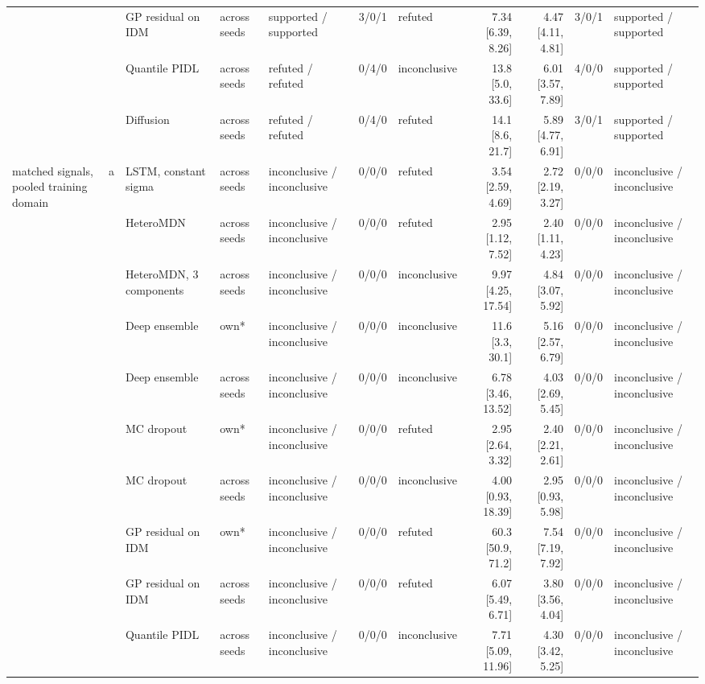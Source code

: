 \begin{longtable}{lllllrlrrrl}
 &  & GP residual on IDM & across seeds & supported / supported & 3/0/1 & refuted & 7.34 [6.39, 8.26] & 4.47 [4.11, 4.81] & 3/0/1 & supported / supported \\
 &  & Quantile PIDL & across seeds & refuted / refuted & 0/4/0 & inconclusive & 13.8 [5.0, 33.6] & 6.01 [3.57, 7.89] & 4/0/0 & supported / supported \\
 &  & Diffusion & across seeds & refuted / refuted & 0/4/0 & refuted & 14.1 [8.6, 21.7] & 5.89 [4.77, 6.91] & 3/0/1 & supported / supported \\
\midrule
matched signals, pooled training domain & a & LSTM, constant sigma & across seeds & inconclusive / inconclusive & 0/0/0 & refuted & 3.54 [2.59, 4.69] & 2.72 [2.19, 3.27] & 0/0/0 & inconclusive / inconclusive \\
 &  & HeteroMDN & across seeds & inconclusive / inconclusive & 0/0/0 & refuted & 2.95 [1.12, 7.52] & 2.40 [1.11, 4.23] & 0/0/0 & inconclusive / inconclusive \\
 &  & HeteroMDN, 3 components & across seeds & inconclusive / inconclusive & 0/0/0 & inconclusive & 9.97 [4.25, 17.54] & 4.84 [3.07, 5.92] & 0/0/0 & inconclusive / inconclusive \\
 &  & Deep ensemble & own* & inconclusive / inconclusive & 0/0/0 & inconclusive & 11.6 [3.3, 30.1] & 5.16 [2.57, 6.79] & 0/0/0 & inconclusive / inconclusive \\
 &  & Deep ensemble & across seeds & inconclusive / inconclusive & 0/0/0 & inconclusive & 6.78 [3.46, 13.52] & 4.03 [2.69, 5.45] & 0/0/0 & inconclusive / inconclusive \\
 &  & MC dropout & own* & inconclusive / inconclusive & 0/0/0 & refuted & 2.95 [2.64, 3.32] & 2.40 [2.21, 2.61] & 0/0/0 & inconclusive / inconclusive \\
 &  & MC dropout & across seeds & inconclusive / inconclusive & 0/0/0 & inconclusive & 4.00 [0.93, 18.39] & 2.95 [0.93, 5.98] & 0/0/0 & inconclusive / inconclusive \\
 &  & GP residual on IDM & own* & inconclusive / inconclusive & 0/0/0 & refuted & 60.3 [50.9, 71.2] & 7.54 [7.19, 7.92] & 0/0/0 & inconclusive / inconclusive \\
 &  & GP residual on IDM & across seeds & inconclusive / inconclusive & 0/0/0 & refuted & 6.07 [5.49, 6.71] & 3.80 [3.56, 4.04] & 0/0/0 & inconclusive / inconclusive \\
 &  & Quantile PIDL & across seeds & inconclusive / inconclusive & 0/0/0 & inconclusive & 7.71 [5.09, 11.96] & 4.30 [3.42, 5.25] & 0/0/0 & inconclusive / inconclusive \\

\end{longtable}
